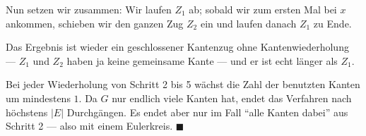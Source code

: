\begin{merksatz}
Nun setzen wir zusammen: Wir laufen $Z_1$ ab; sobald wir zum ersten Mal bei $x$ ankommen, schieben wir den ganzen Zug $Z_2$ ein und laufen danach $Z_1$ zu Ende.

\begin{center}
\end{center}

Das Ergebnis ist wieder ein geschlossener Kantenzug ohne Kantenwiederholung --- $Z_1$ und $Z_2$ haben ja keine gemeinsame Kante --- und er ist echt länger als $Z_1$.

Bei jeder Wiederholung von Schritt 2 bis 5 wächst die Zahl der benutzten Kanten um mindestens $1$. Da $G$ nur endlich viele Kanten hat, endet das Verfahren nach höchstens $|E|$ Durchgängen. Es endet aber nur im Fall \enquote{alle Kanten dabei} aus Schritt 2 --- also mit einem Eulerkreis. $\blacksquare$
\end{merksatz}


